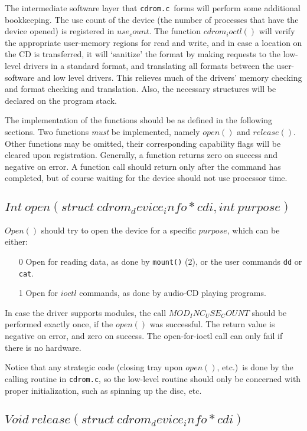 \documentclass{article}
\def\cdromc{{\tt {cdrom.c}}}
\begin{document}
The intermediate software layer that \cdromc\ forms will perform some
additional bookkeeping. The use count of the device (the number of
processes that have the device opened) is registered in $use_count$. The
function $cdrom_ioctl()$ will verify the appropriate user-memory regions
for read and write, and in case a location on the CD is transferred,
it will `sanitize' the format by making requests to the low-level
drivers in a standard format, and translating all formats between the
user-software and low level drivers. This relieves much of the drivers'
memory checking and format checking and translation. Also, the necessary
structures will be declared on the program stack.

The implementation of the functions should be as defined in the
following sections. Two functions {\em must\/} be implemented, namely
$open()$ and $release()$. Other functions may be omitted, their
corresponding capability flags will be cleared upon registration.
Generally, a function returns zero on success and negative on error. A
function call should return only after the command has completed, but of
course waiting for the device should not use processor time.

\subsection{$Int\ open(struct\ cdrom_device_info * cdi, int\ purpose)$}

$Open()$ should try to open the device for a specific $purpose$, which
can be either:
\begin{itemize}
\item[0] Open for reading data, as done by {\tt {mount()}} (2), or the
user commands {\tt {dd}} or {\tt {cat}}.  
\item[1] Open for $ioctl$ commands, as done by audio-CD playing
programs.
\end{itemize}
In case the driver supports modules, the call $MOD_INC_USE_COUNT$
should be performed exactly once, if the $open()$ was successful. The
return value is negative on error, and zero on success. The
open-for-ioctl call can only fail if there is no hardware.

Notice that any strategic code (closing tray upon $open()$, etc.)\ is
done by the calling routine in \cdromc, so the low-level routine
should only be concerned with proper initialization, such as spinning
up the disc, etc. %


\subsection{$Void\ release(struct\ cdrom_device_info * cdi)$}
\end{document}
